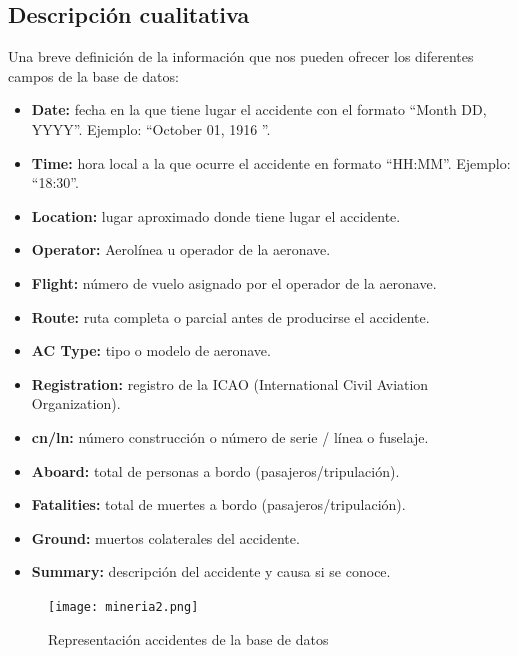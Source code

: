 \documentclass[a4paper,10pt]{article}
\begin{document}
\subsection{Descripci\'on cualitativa}
Una breve definici\'on de la informaci\'on que nos pueden ofrecer los diferentes campos de la base de datos:
\begin{itemize}
\item \textbf{Date:} fecha en la que tiene lugar el accidente con el formato ``Month DD, YYYY''. Ejemplo: ``October 01, 1916 ''.
\item \textbf{Time:} hora local a la que ocurre el accidente en formato ``HH:MM''. Ejemplo: ``18:30''.
\item \textbf{Location:} lugar aproximado  donde tiene lugar el accidente.
\item \textbf{Operator:} Aerol\'inea u operador de la aeronave.
\item \textbf{Flight:} n\'umero de vuelo asignado por el operador de la aeronave.
\item \textbf{Route:} ruta completa o parcial antes de producirse el accidente.
\item \textbf{AC Type:} tipo o modelo de aeronave.
\item \textbf{Registration:} registro de la ICAO (International Civil Aviation Organization).
\item \textbf{cn/ln:} n\'umero construcci\'on o n\'umero de serie / l\'inea o fuselaje.
\item \textbf{Aboard:} total de personas a bordo (pasajeros/tripulaci\'on).
\item \textbf{Fatalities:} total de muertes a bordo (pasajeros/tripulaci\'on).
\item \textbf{Ground:} muertos colaterales del accidente.
\item \textbf{Summary:} descripci\'on del accidente y causa si se conoce.
\end{itemize}

\begin{figure}[h]
        	\centering
    \texttt{[image: mineria2.png]}
    \caption{Representaci\'on accidentes de la base de datos}
    \label{fig:inicio}
        \end{figure}
\end{document}
